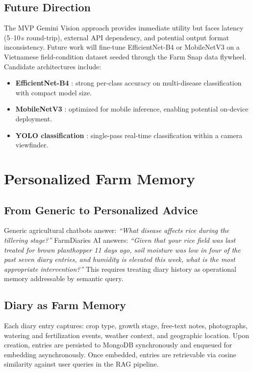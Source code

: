 \documentclass[conference]{IEEEtran}
\begin{document}
\subsection{Future Direction}

The MVP Gemini Vision approach provides immediate utility but faces latency (5--10\,s round-trip), external API dependency, and potential output format inconsistency. Future work will fine-tune EfficientNet-B4 or MobileNetV3 on a Vietnamese field-condition dataset seeded through the Farm Snap data flywheel. Candidate architectures include:
\begin{itemize}
    \item \textbf{EfficientNet-B4} \cite{tan2019}: strong per-class accuracy on multi-disease classification with compact model size.
    \item \textbf{MobileNetV3} \cite{howard2019}: optimized for mobile inference, enabling potential on-device deployment.
    \item \textbf{YOLO classification} \cite{redmon2016}: single-pass real-time classification within a camera viewfinder.
\end{itemize}

\section{Personalized Farm Memory}

\subsection{From Generic to Personalized Advice}

Generic agricultural chatbots answer: \textit{``What disease affects rice during the tillering stage?''} FarmDiaries AI answers: \textit{``Given that your rice field was last treated for brown planthopper 11 days ago, soil moisture was low in four of the past seven diary entries, and humidity is elevated this week, what is the most appropriate intervention?''} This requires treating diary history as operational memory addressable by semantic query.

\subsection{Diary as Farm Memory}

Each diary entry captures: crop type, growth stage, free-text notes, photographs, watering and fertilization events, weather context, and geographic location. Upon creation, entries are persisted to MongoDB synchronously and enqueued for embedding asynchronously. Once embedded, entries are retrievable via cosine similarity against user queries in the RAG pipeline.
\end{document}
